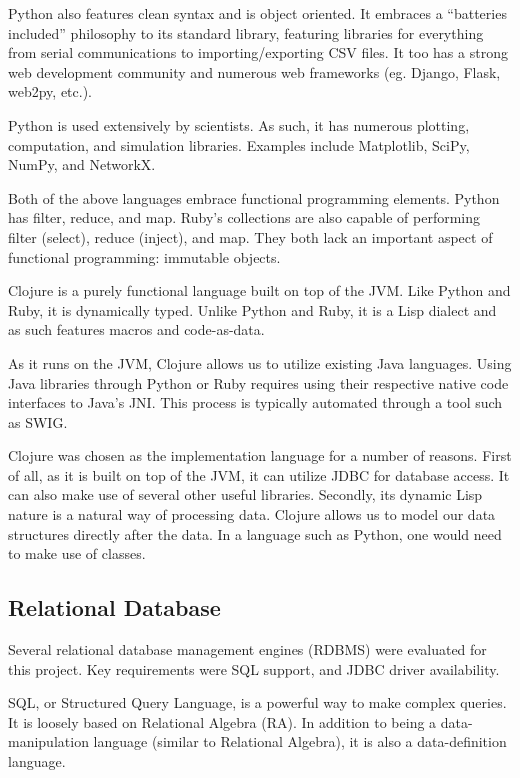 \documentclass[12pt,letterpaper,oneside,notitlepage]{report}
\theoremstyle{definition}
\begin{document}
				Python also features clean syntax and is object oriented.  It embraces a ``batteries included'' philosophy to its standard library, featuring libraries for everything from serial communications to importing/exporting CSV files.  It too has a strong web development community and numerous web frameworks (eg. Django, Flask, web2py, etc.).
				
				Python is used extensively by scientists.  As such, it has numerous plotting, computation, and simulation libraries.  Examples include Matplotlib, SciPy, NumPy, and NetworkX.
				
				Both of the above languages embrace functional programming elements.  Python has filter, reduce, and map.  Ruby's collections are also capable of performing filter (select), reduce (inject), and map.  They both lack an important aspect of functional programming:  immutable objects.
				
				Clojure is a purely functional language built on top of the JVM.  Like Python and Ruby, it is dynamically typed.  Unlike Python and Ruby, it is a Lisp dialect and as such features macros and code-as-data.
				
				As it runs on the JVM, Clojure allows us to utilize existing Java languages.  Using Java libraries through Python or Ruby requires using their respective native code interfaces to Java's JNI.  This process is typically automated through a tool such as SWIG.
				
				Clojure was chosen as the implementation language for a number of reasons.  First of all, as it is built on top of the JVM, it can utilize JDBC for database access.  It can also make use of several other useful libraries.  Secondly, its dynamic Lisp nature is a natural way of processing data.  Clojure allows us to model our data structures directly after the data.  In a language such as Python, one would need to make use of classes.
			
			\subsection{Relational Database}
				Several relational database management engines (RDBMS) were evaluated for this project.  Key requirements were SQL support, and JDBC driver availability.
				
				SQL, or Structured Query Language, is a powerful way to make complex queries.  It is loosely based on Relational Algebra (RA)\cite[p.~243]{dbsys-06}.  In addition to being a data-manipulation language (similar to Relational Algebra), it is also a data-definition language.
				
\end{document}
